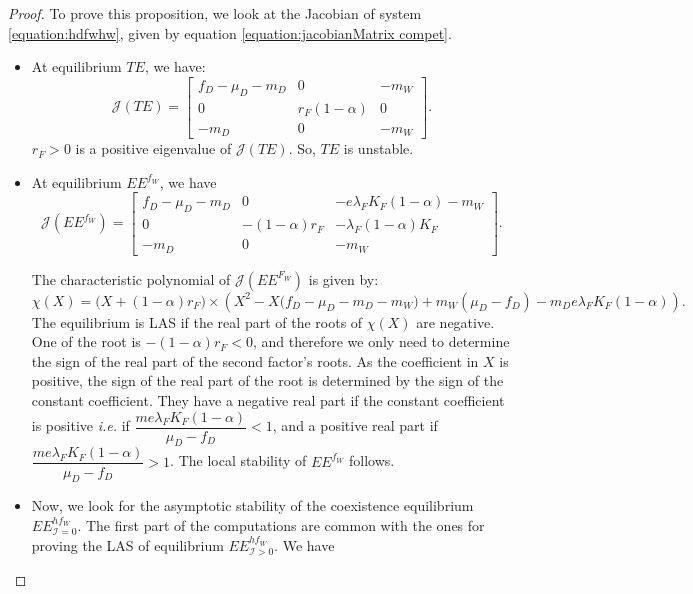 \documentclass{article}
\newcommand{\lfw}{\lambda_{F}}
\newcommand{\lfw}{\lambda_{F}}
\newcommand{\cI}{\mathcal{I}}
\theoremstyle{definition}
\theoremstyle{remark}
\begin{document}
\begin{proof}
To prove this proposition, we look at the Jacobian of system \eqref{equation:hdfwhw}, given by equation \eqref{equation:jacobianMatrix compet}.


\begin{itemize}
\item At equilibrium $TE$, we have:
\begin{equation*}
\mathcal{J}(TE) = \begin{bmatrix}
f_D-\mu_D - m_D & 0 &  -m_W \\
0 & r_F(1-\alpha)  &  0\\
-m_D & 0 & -m_W
\end{bmatrix}.
\end{equation*}
$r_F > 0$ is a positive eigenvalue of $\mathcal{J}(TE)$. So, $TE$ is unstable.
\item At equilibrium $EE^{f_W}$, we have
\begin{equation*}
\mathcal{J}(EE^{f_W}) = \begin{bmatrix}
f_D-\mu_D - m_D & 0 & -e\lfw K_F(1-\alpha) - m_W \\
0 & -(1-\alpha)r_F  & -\lfw(1-\alpha)K_F  \\
-m_D & 0 & -m_W
\end{bmatrix}.
\end{equation*}

The characteristic polynomial of $\mathcal{J}(EE^{F_W})$ is given by:
\begin{equation*}
\chi(X) = \big(X +(1-\alpha)r_F\big) \times \left(X^2 - X\Big(f_D - \mu_D - m_D - m_W \Big) + m_W(\mu_D - f_D) - m_D e \lfw K_F(1-\alpha) \right).
\end{equation*}
The equilibrium is LAS if the real part of the roots of $\chi(X)$ are negative. One of the root is $-(1-\alpha)r_F < 0$, and therefore we only need to determine the sign of the real part of the second factor's roots. As the coefficient in $X$ is positive, the sign of the real part of the root is determined by the sign of the constant coefficient.
They have a negative real part if the constant coefficient is positive \textit{i.e.} if $\dfrac{m e \lfw K_F(1-\alpha)}{\mu_D - f_D} < 1 $, and a positive real part if $\dfrac{m e \lfw K_F(1-\alpha)}{\mu_D - f_D} > 1 $. The local stability of $EE^{f_W}$ follows.

\item Now, we look for the asymptotic stability of the coexistence equilibrium $EE^{hf_W}_{\cI=0}$. The first part of the computations are common with the ones for proving the LAS of equilibrium $EE^{hf_W}_{\cI >0}$.
We have



\end{itemize}
\end{proof}
\end{document}

